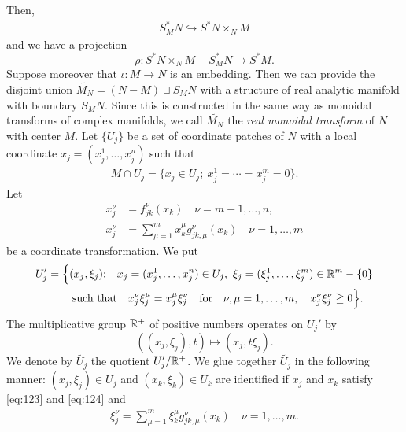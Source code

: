 Then,
\begin{align*}
    S^\ast_{M}N \hookrightarrow S^\ast N \times_{N} M
\end{align*}
and we have a projection
\begin{equation}
    \rho \colon S^\ast N \times_{N} M - S^\ast_{M}N \longrightarrow S^\ast M.
\end{equation}%
Suppose moreover that $\iota\colon M \to N$ is an embedding. 
Then we can provide the disjoint 
union $\widetilde{M_N} = (N - M)\sqcup S_{M}N$ with 
a structure of real analytic manifold with boundary $S_{M}N$.
Since this is constructed in the same way as monoidal transforms 
of complex manifolds, we call $\widetilde{M_N}$ the \emph{real monoidal 
transform} of $N$ with center $M$.
Let $\{U_j\}$ be a set of coordinate patches of $N$ with 
a local coordinate $x_j = (x_j^1, \ldots ,x_j^n)$ such that
\begin{align*}
    M\cap U_j = \{x_j\in U_j ;\ x_j^1 = \cdots =x_j^m=0\}.
\end{align*}
Let 
\begin{align}
    x_j^\nu &= f_{jk}^\nu(x_k) \quad\nu = m+1,\ldots,n,  \label{eq:123}\\
    x_j^\nu &= \sum_{\mu=1}^{m}x_k^\mu g_{jk,\mu}^\nu(x_k) \quad\nu = 1,\ldots,m \label{eq:124}
\end{align}%
be a coordinate transformation. We put
\begin{align*}
    U_j' = \Big{\{} 
        (x_j,\xi_j);\quad  
        &x_j = (x_j^1, \ldots ,x_j^n)\in U_j,\ 
        \xi_j = (\xi_j^1, \ldots ,\xi_j^m) \in\RR^m - \{0\}\\
        \text{such that}&\quad 
        x_j^\nu\xi_j^\mu = x_j^\mu \xi_j^\nu 
        \quad\text{for}\quad 
        \nu,\mu = 1,\ldots,m, 
        \quad x_j^\nu \xi_j^\nu \geqq 0
    \Big{\}}.
\end{align*}    
The multiplicative group $\mathbb{R}^+$ of positive numbers 
operates on $U_j'$ by \[
    \left(\left(x_j, \xi_j\right), t\right)
    \mapsto \left(x_j,t\xi_j\right).
\] 
We denote by $\widetilde{U_j}$ the quotient $U'_j/\mathbb{R}^+$. 
We glue together $\widetilde{U_j}$ in the following 
manner: $(x_j,\xi_j)\in U_j$ and $(x_k,\xi_k)\in U_k$ are 
identified if $x_j$ and $x_k$ satisfy \eqref{eq:123} and \eqref{eq:124} and
\begin{align*}
    {\xi}_j^{\nu} = \sum_{\mu=1}^{m}{\xi}_k^{\mu}g_{jk,\mu}^{\nu}(x_k)\quad {\nu} = 1,\ldots,m.
\end{align*}

